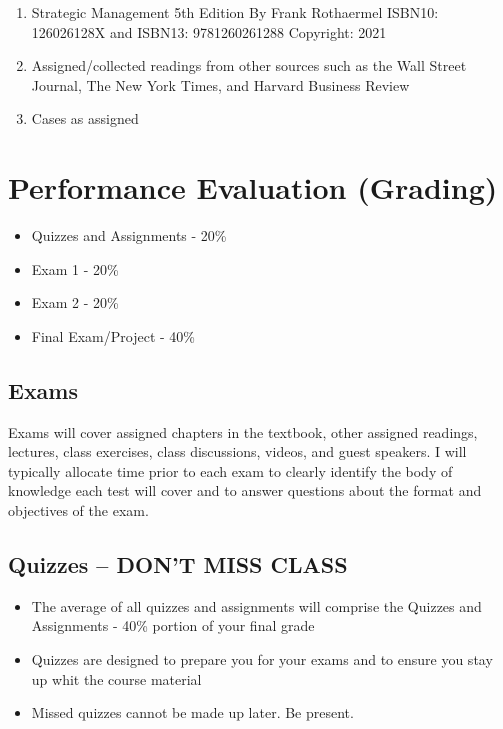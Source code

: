 \documentclass[
]{book}
\providecommand{\tightlist}{%
  \setlength{\itemsep}{0pt}\setlength{\parskip}{0pt}}
\begin{document}
\begin{enumerate}
\def\labelenumi{\arabic{enumi}.}
\tightlist
\item
  Strategic Management 5th Edition By Frank Rothaermel ISBN10: 126026128X and ISBN13: 9781260261288
  Copyright: 2021
\item
  Assigned/collected readings from other sources such as the Wall Street Journal, The New York Times, and Harvard Business Review
\item
  Cases as assigned
\end{enumerate}

\hypertarget{performance-evaluation-grading}{%
\section*{Performance Evaluation (Grading)}\label{performance-evaluation-grading}}

\begin{itemize}
\tightlist
\item
  Quizzes and Assignments - 20\%
\item
  Exam 1 - 20\%
\item
  Exam 2 - 20\%
\item
  Final Exam/Project - 40\%
\end{itemize}

\hypertarget{exams}{%
\subsection*{Exams}\label{exams}}

Exams will cover assigned chapters in the textbook, other assigned readings, lectures, class exercises, class discussions, videos, and guest speakers. I will typically allocate time prior to each exam to clearly identify the body of knowledge each test will cover and to answer questions about the format and objectives of the exam.

\hypertarget{quizzes-dont-miss-class}{%
\subsection*{\texorpdfstring{Quizzes -- \textbf{DON'T MISS CLASS}}{Quizzes -- DON'T MISS CLASS}}\label{quizzes-dont-miss-class}}

\begin{itemize}
\tightlist
\item
  The average of all quizzes and assignments will comprise the Quizzes and Assignments - 40\% portion of your final grade
\item
  Quizzes are designed to prepare you for your exams and to ensure you stay up whit the course material
\item
  Missed quizzes cannot be made up later. Be present.
\end{itemize}
\end{document}
